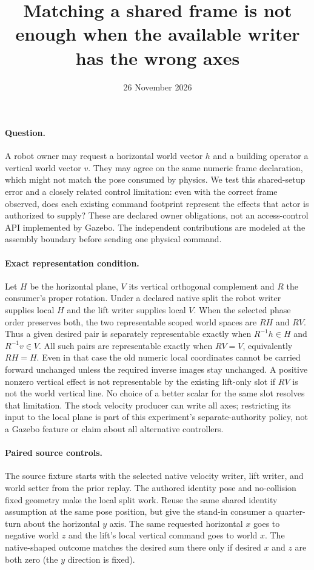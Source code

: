 \documentclass[11pt]{article}
\title{Matching a shared frame is not enough when the available writer has the wrong axes}
\date{26 November 2026}
\begin{document}
\maketitle
\paragraph{Question.}
A robot owner may request a horizontal world vector $h$ and a
building operator a vertical world vector $v$. They may agree on
the same numeric frame declaration, which might not match the
pose consumed by physics. We test this shared-setup error and a
closely related control limitation: even with the correct frame
observed, does each existing command footprint represent the
effects that actor is authorized to supply?
These are declared owner obligations, not an access-control API
implemented by Gazebo. The independent contributions are modeled
at the assembly boundary before sending one physical command.

\paragraph{Exact representation condition.}
Let $H$ be the horizontal plane, $V$ its vertical orthogonal
complement and $R$ the consumer's proper rotation. Under a
declared native split the robot writer supplies local $H$ and
the lift writer supplies local $V$. When the selected phase order
preserves both, the two representable scoped world spaces are
$RH$ and $RV$. Thus a given desired pair is separately
representable exactly when $R^{-1}h\in H$ and $R^{-1}v\in V$.
All such pairs are representable exactly when $RV=V$, equivalently
$RH=H$. Even in that case the old numeric local coordinates
cannot be carried forward unchanged unless the required inverse
images stay unchanged. A positive nonzero vertical effect is not
representable by the existing lift-only slot if $RV$ is not the
world vertical line. No choice of a better scalar for the same
slot resolves that limitation. The stock velocity producer can
write all axes; restricting its input to the local plane is
part of this experiment's separate-authority policy, not a
Gazebo feature or claim about all alternative controllers.

\paragraph{Paired source controls.}
The source fixture starts with the selected native velocity
writer, lift writer, and world setter from the prior replay.
The authored identity pose and no-collision fixed geometry make
the local split work. Reuse the same shared identity assumption
at the same pose position, but give the stand-in consumer a
quarter-turn about the horizontal $y$ axis. The same requested
horizontal $x$ goes to negative world $z$ and the lift's local
vertical command goes to world $x$. The native-shaped outcome
matches the desired sum there only if desired $x$ and $z$ are both
zero (the $y$ direction is fixed).
\end{document}
